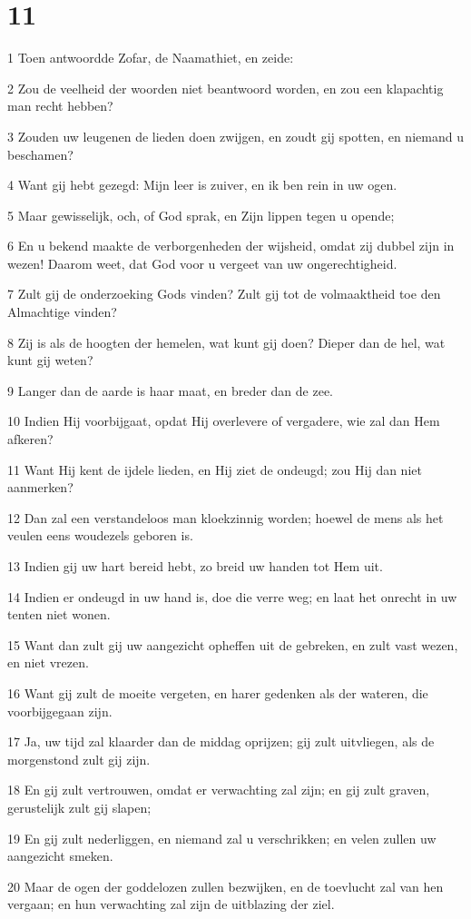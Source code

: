 \chapter{11}

\par 1 Toen antwoordde Zofar, de Naamathiet, en zeide:
\par 2 Zou de veelheid der woorden niet beantwoord worden, en zou een klapachtig man recht hebben?
\par 3 Zouden uw leugenen de lieden doen zwijgen, en zoudt gij spotten, en niemand u beschamen?
\par 4 Want gij hebt gezegd: Mijn leer is zuiver, en ik ben rein in uw ogen.
\par 5 Maar gewisselijk, och, of God sprak, en Zijn lippen tegen u opende;
\par 6 En u bekend maakte de verborgenheden der wijsheid, omdat zij dubbel zijn in wezen! Daarom weet, dat God voor u vergeet van uw ongerechtigheid.
\par 7 Zult gij de onderzoeking Gods vinden? Zult gij tot de volmaaktheid toe den Almachtige vinden?
\par 8 Zij is als de hoogten der hemelen, wat kunt gij doen? Dieper dan de hel, wat kunt gij weten?
\par 9 Langer dan de aarde is haar maat, en breder dan de zee.
\par 10 Indien Hij voorbijgaat, opdat Hij overlevere of vergadere, wie zal dan Hem afkeren?
\par 11 Want Hij kent de ijdele lieden, en Hij ziet de ondeugd; zou Hij dan niet aanmerken?
\par 12 Dan zal een verstandeloos man kloekzinnig worden; hoewel de mens als het veulen eens woudezels geboren is.
\par 13 Indien gij uw hart bereid hebt, zo breid uw handen tot Hem uit.
\par 14 Indien er ondeugd in uw hand is, doe die verre weg; en laat het onrecht in uw tenten niet wonen.
\par 15 Want dan zult gij uw aangezicht opheffen uit de gebreken, en zult vast wezen, en niet vrezen.
\par 16 Want gij zult de moeite vergeten, en harer gedenken als der wateren, die voorbijgegaan zijn.
\par 17 Ja, uw tijd zal klaarder dan de middag oprijzen; gij zult uitvliegen, als de morgenstond zult gij zijn.
\par 18 En gij zult vertrouwen, omdat er verwachting zal zijn; en gij zult graven, gerustelijk zult gij slapen;
\par 19 En gij zult nederliggen, en niemand zal u verschrikken; en velen zullen uw aangezicht smeken.
\par 20 Maar de ogen der goddelozen zullen bezwijken, en de toevlucht zal van hen vergaan; en hun verwachting zal zijn de uitblazing der ziel.

